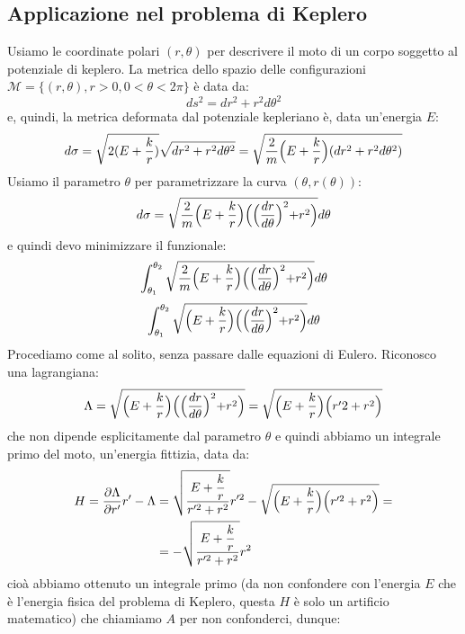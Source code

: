\documentclass[a4paper,openany]{article}
\begin{document}
	\subsection{Applicazione nel problema di Keplero}
	Usiamo le coordinate polari $(r,\theta)$ per descrivere il moto di un corpo soggetto al potenziale di keplero. La metrica dello spazio delle configurazioni $\mathcal{M} = \{(r,\theta), r>0, 0 <\theta < 2\pi\}$ è data da:
	$$
	ds^2 = dr^2 + r^2d\theta^2
	$$
	e, quindi, la metrica deformata dal potenziale kepleriano è, data un'energia $E$:
	$$
	d\sigma = \sqrt{2(E+\dfrac{k}{r})} \sqrt{dr^2 + r^2d\theta^2} = \sqrt{\dfrac{2}{m}\Bigl(E+\dfrac{k}{r}\Bigl)(dr^2 + r^2d\theta^2)}
	$$
	Usiamo il parametro $\theta$ per parametrizzare la curva $(\theta, r(\theta))$:
	\begin{equation}\label{key}
		d\sigma =  \sqrt{\dfrac{2}{m}\Bigl(E+\dfrac{k}{r}\Bigl)\Bigl(\Bigl(\dfrac{dr}{d\theta}\Bigl)^2 + r^2\Bigl)}d\theta
	\end{equation}
e quindi devo minimizzare il funzionale:
\begin{equation}\label{key}
	\int_{\theta_1}^{\theta_2} \sqrt{\dfrac{2}{m}\Bigl(E+\dfrac{k}{r}\Bigl)\Bigl(\Bigl(\dfrac{dr}{d\theta}\Bigl)^2 + r^2\Bigl)}d\theta 
\end{equation}
\begin{equation}\label{key}
	\int_{\theta_1}^{\theta_2} \sqrt{\Bigl(E+\dfrac{k}{r}\Bigl)\Bigl(\Bigl(\dfrac{dr}{d\theta}\Bigl)^2 + r^2\Bigl)}d\theta 
\end{equation}
Procediamo come al solito, senza passare dalle equazioni di Eulero. Riconosco una lagrangiana:
\begin{equation}\label{key}
	\Lambda = \sqrt{\Bigl(E+\dfrac{k}{r}\Bigl)\Bigl(\Bigl(\dfrac{dr}{d\theta}\Bigl)^2 + r^2\Bigl)}= \sqrt{\Bigl(E+\dfrac{k}{r}\Bigl)\Bigl(r'2 + r^2\Bigl)}
\end{equation}
che non dipende esplicitamente dal parametro $\theta$ e quindi abbiamo un integrale primo del moto, un'energia fittizia, data da:
\begin{equation}\label{key}
	\begin{aligned}
	H = \dfrac{\partial\Lambda}{\partial r'}r'-\Lambda &= \sqrt{\dfrac{E+\dfrac{k}{r}}{r'^2+r^2}}r'^2 -  \sqrt{\Bigl(E+\dfrac{k}{r}\Bigl)\Bigl(r'^2 + r^2\Bigl)} = \\
	&= - \sqrt{\dfrac{E+\dfrac{k}{r}}{r'^2+r^2}}r^2
	\end{aligned}
\end{equation}
cioà abbiamo ottenuto un integrale primo (da non confondere con l'energia $E$ che è l'energia fisica del problema di Keplero, questa $H$ è solo un artificio matematico) che chiamiamo $A$ per non confonderci, dunque:
\end{document}
